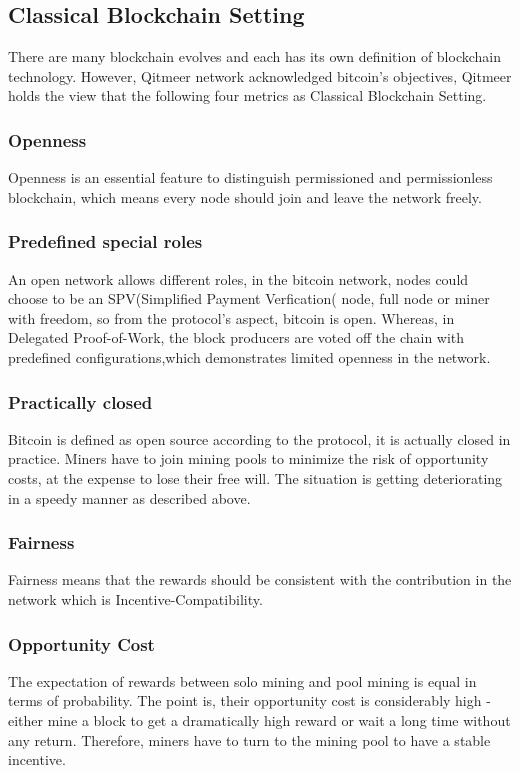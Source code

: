 \documentclass[a4paper,11pt]{article}
\begin{document}
\subsection{Classical Blockchain Setting}
There are many blockchain evolves and each has its own definition of blockchain technology. However, Qitmeer network acknowledged  bitcoin’s objectives, Qitmeer holds the view that the following four metrics as Classical Blockchain Setting.

\subsubsection{Openness}
Openness is an essential feature to distinguish permissioned and permissionless blockchain, which means every node should join and leave the network freely.


\subsubsection*{Predefined special roles}
An open network allows different roles, in the bitcoin network, nodes could choose to be an SPV(Simplified Payment Verfication( node, full node or miner with freedom, so from the protocol’s aspect, bitcoin is open. Whereas, in Delegated Proof-of-Work, the block producers are voted off the chain with predefined  configurations,which demonstrates limited openness in the network.

\subsubsection*{Practically closed}
Bitcoin is defined as open source according to the protocol, it is actually closed in practice. Miners have to join mining pools to minimize the risk of opportunity costs, at the expense to lose their free will. The situation is getting deteriorating in a speedy manner as described above. 


\subsubsection{Fairness}
Fairness means that the rewards should be consistent with the contribution in the network which is Incentive-Compatibility.

\subsubsection*{Opportunity Cost}
The expectation of rewards between solo mining and pool mining is equal in terms of probability. The point is, their opportunity cost is considerably high - either mine a block to get a dramatically high reward or wait a long time without any return. Therefore, miners have to turn to the mining pool to have a stable incentive.
\end{document}
